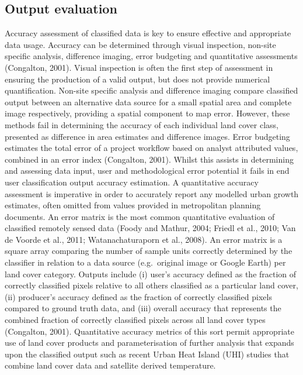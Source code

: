 \documentclass[]{book}
\begin{document}
\subsection{Output evaluation}\label{output-evaluation}

Accuracy assessment of classified data is key to ensure effective and
appropriate data usage. Accuracy can be determined through visual
inspection, non-site specific analysis, difference imaging, error
budgeting and quantitative assessments (Congalton, 2001). Visual
inspection is often the first step of assessment in ensuring the
production of a valid output, but does not provide numerical
quantification. Non-site specific analysis and difference imaging
compare classified output between an alternative data source for a small
spatial area and complete image respectively, providing a spatial
component to map error. However, these methods fail in determining the
accuracy of each individual land cover class, presented as difference in
area estimates and difference images. Error budgeting estimates the
total error of a project workflow based on analyst attributed values,
combined in an error index (Congalton, 2001). Whilst this assists in
determining and assessing data input, user and methodological error
potential it fails in end user classification output accuracy
estimation. A quantitative accuracy assessment is imperative in order to
accurately report any modelled urban growth estimates, often omitted
from values provided in metropolitan planning documents. An error matrix
is the most common quantitative evaluation of classified remotely sensed
data (Foody and Mathur, 2004; Friedl et al., 2010; Van de Voorde et al.,
2011; Watanachaturaporn et al., 2008). An error matrix is a square array
comparing the number of sample units correctly determined by the
classifier in relation to a data source (e.g.~original image or Google
Earth) per land cover category. Outputs include (i) user's accuracy
defined as the fraction of correctly classified pixels relative to all
others classified as a particular land cover, (ii) producer's accuracy
defined as the fraction of correctly classified pixels compared to
ground truth data, and (iii) overall accuracy that represents the
combined fraction of correctly classified pixels across all land cover
types (Congalton, 2001). Quantitative accuracy metrics of this sort
permit appropriate use of land cover products and parameterisation of
further analysis that expands upon the classified output such as recent
Urban Heat Island (UHI) studies that combine land cover data and
satellite derived temperature.
\end{document}
